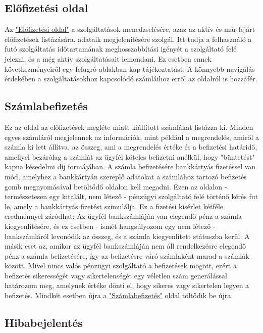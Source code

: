 \documentclass[centeredchapter]{thesis-ekf}
\theoremstyle{definition}
\theoremstyle{remark}
\begin{document}
\subsection{Előfizetési oldal}\hypertarget{leiras-elofizetesi}{}

Az \hyperlink{leiras-elofizetesi}{"Előfizetési oldal"} a szolgáltatások menedzselésére, azaz az aktív és már lejárt előfizetések listázására, adataik megjelenítésére szolgál. Itt tudja a felhasználó a futó szolgáltatás időtartamának meghosszabbítási igényét a szolgáltató felé jelezni, és a még aktív szolgáltatásait lemondani. Ez esetben ennek következményeiről egy felugró ablakban kap tájékoztatást. A könnyebb navigálás érdekében a szolgáltatásokhoz kapcsolódó számláihoz erről az oldalról is hozzáfér.

\subsection{Számlabefizetés}\hypertarget{leiras-szamla}{}

Ez az oldal az előfizetések megléte miatt kiállított számlákat listázza ki. Minden egyes számláról megjelennek az információk, mint például a megrendelés, amiről a számla ki lett állítva, az összeg, ami a megrendelés értéke és a befizetési határidő, amellyel bezárólag a számlát az ügyfél köteles befizetni anélkül, hogy "büntetést" kapna késedelmi díj formájában. A számla befizetésére bankkártyás fizetéssel van mód, amelyhez a bankkártyán szereplő adatokat a számlához tartozó befizetés gomb megnyomásával betöltődő oldalon kell megadni. Ezen az oldalon - természetesen egy kitalált, nem létező - pénzügyi szolgáltató felé történő kérés fut le, amely a bankkártyás fizetést szimulálja. Ez a fizetési kísérlet kétféle eredménnyel záródhat:
 Az ügyfél bankszámláján van elegendő pénz a számla kiegyenlítésére, és ez esetben - ismét hangsúlyozom egy nem létező - bankszámláról levonódik az összeg, és a számla kiegyenlített státuszba kerül.
 A másik eset az, amikor az ügyfél bankszámláján nem áll rendelkezésre elegendő pénz a számla befizetésére, így az befizetésre váró számlaként marad a számlák között.
 Mivel nincs valós pénzügyi szolgáltató a befizetések mögött, ezért a befizetés sikerességét vagy sikertelenségét egy véletlen szám generálással határozom meg, amelynek értéke dönti el, hogy sikeres vagy sikertelen legyen a befizetés. Mindkét esetben újra a \hyperlink{leiras-szamla}{"Számlabefizetés"} oldal töltődik be újra.

\subsection{Hibabejelentés}\hypertarget{leiras-bejelentes}{}
\end{document}
